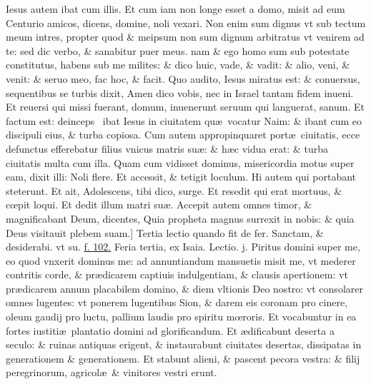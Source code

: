 \documentclass[a5paper,10pt]{book}
\def\leftmarginnote{%
	\lrmarginnote{\hskip -\marginparsep \hskip -6.5em}}
\def\rightmarginnote{%
	\lrmarginnote{\hskip\columnwidth \hskip -1em}}
\def\ae{æ}
\def\oe{œ}
\begin{document}
\begin{multicols*}{2}
Iesus autem ibat cum illis.
Et cum iam non longe esset a domo, misit ad eum Centurio amicos, dicens, domine, noli vexari.
Non enim sum dignus vt sub tectum meum intres, propter quod \& meipsum non sum dignum arbitratus vt venirem ad te: sed dic verbo, \& sanabitur puer meus. nam \& ego homo sum sub potestate constitutus, habens sub me milites: \& dico huic, vade, \& vadit: \& alio, veni, \& venit: \& seruo meo, fac hoc, \& facit.
Quo audito, Iesus miratus est: \& conuersus, sequentibus se turbis dixit, Amen dico vobis, nec in Israel tantam fidem inueni.
Et reuersi qui missi fuerant, domum, inuenerunt seruum qui languerat, sanum.
Et factum est: deinceps \textdagger \ ibat\leftmarginnote{\begin{flushright}B\end{flushright}} Iesus in ciuitatem qu\ae \ vocatur Naim: \& ibant cum eo discipuli eius, \& turba copiosa.
Cum autem appropinquaret port\ae \ ciuitatis, ecce defunctus efferebatur filius vnicus matris su\ae : \& h\ae c vidua erat: \& turba ciuitatis multa cum illa.
Quam cum vidisset dominus, misericordia motus super eam,
dixit illi: Noli flere.
Et accessit, \& tetigit loculum. Hi autem qui portabant steterunt. Et ait, Adolescens, tibi dico, surge. Et resedit qui erat mortuus, \& c\oe pit loqui. Et dedit illum matri su\ae .
Accepit autem omnes timor, \& magnificabant Deum, dicentes, Quia propheta magnus surrexit in nobis: \& quia Deus visitauit plebem suam.]
\newline \color{red} Tertia lectio quando fit de fer. \color{black} Sanctam, \& desiderabi. \color{red} vt su. \color{black} \hyperlink{page.102}{f. 102.}
\newline {} \color{red} \hypertarget{TUE-TERTIA-ADV}{Feria tertia,} ex Isaia. \hfill Lectio. j. \color{black}
\vspace{-.25em}
Piritus\rightmarginnote{c. 61.} domini super me, eo quod vnxerit dominus me: ad annuntiandum mansuetis misit me, vt mederer contritis corde, \& pr\ae dicarem captiuis indulgentiam, \& clausis apertionem: vt pr\ae dicarem annum placabilem domino, \& diem vltionis Deo nostro: vt consolarer omnes lugentes: vt ponerem lugentibus Sion, \& darem eis coronam pro cinere, oleum gaudij pro luctu, pallium laudis pro spiritu m\oe roris.
Et vocabuntur in ea fortes iustiti\ae \ plantatio domini ad glorificandum.
Et \ae dificabunt deserta a seculo: \& ruinas antiquas erigent, \& instaurabunt ciuitates desertas, dissipatas in generationem \& generationem.
Et stabunt alieni, \& pascent pecora vestra: \& filij peregrinorum, agricol\ae \ \& vinitores vestri erunt.

\end{multicols*}
\end{document}
